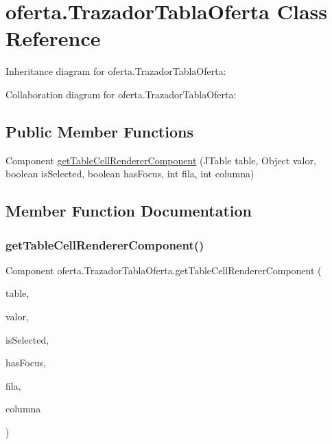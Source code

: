 \hypertarget{classoferta_1_1_trazador_tabla_oferta}{}\section{oferta.\+Trazador\+Tabla\+Oferta Class Reference}
\label{classoferta_1_1_trazador_tabla_oferta}


Inheritance diagram for oferta.\+Trazador\+Tabla\+Oferta\+:


Collaboration diagram for oferta.\+Trazador\+Tabla\+Oferta\+:
\subsection*{Public Member Functions}
\begin{DoxyCompactItemize}
\item 
Component \mbox{\hyperlink{classoferta_1_1_trazador_tabla_oferta_af84656dfae0fe918cf12d01a145a4e10}{get\+Table\+Cell\+Renderer\+Component}} (J\+Table table, Object valor, boolean is\+Selected, boolean has\+Focus, int fila, int columna)
\end{DoxyCompactItemize}


\subsection{Member Function Documentation}
\mbox{\label{classoferta_1_1_trazador_tabla_oferta_af84656dfae0fe918cf12d01a145a4e10}} 
\subsubsection{\texorpdfstring{get\+Table\+Cell\+Renderer\+Component()}{getTableCellRendererComponent()}}
{\footnotesize\ttfamily Component oferta.\+Trazador\+Tabla\+Oferta.\+get\+Table\+Cell\+Renderer\+Component (\begin{DoxyParamCaption}\item[{J\+Table}]{table,  }\item[{Object}]{valor,  }\item[{boolean}]{is\+Selected,  }\item[{boolean}]{has\+Focus,  }\item[{int}]{fila,  }\item[{int}]{columna }\end{DoxyParamCaption})\hspace{0.3cm}{\ttfamily [inline]}}

